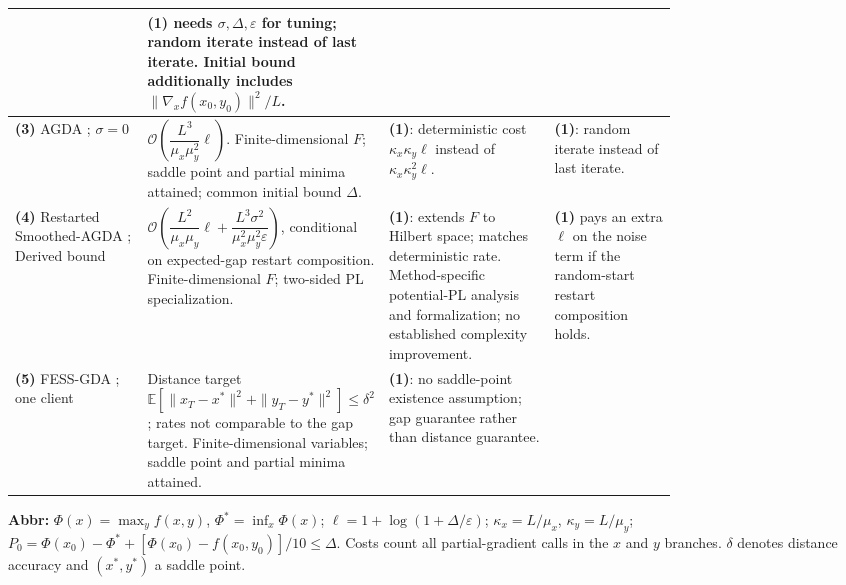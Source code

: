 \begin{table}[tp]
\begin{threeparttable}
\begin{tabularx}{\linewidth}{@{}>{\raggedright\arraybackslash}p{0.20\linewidth}>{\raggedright\arraybackslash}p{0.32\linewidth}>{\raggedright\arraybackslash}p{0.25\linewidth}>{\raggedright\arraybackslash}X@{}}
& \textbf{(1)} needs $\sigma,\Delta,\varepsilon$ for tuning; random iterate instead of last iterate. Initial bound additionally includes $\|\nabla_x f(x_0,y_0)\|^2/L$. \\
\midrule
\textbf{(3)} AGDA \citep[Theorem 3.2]{stplYang2020}; $\sigma=0$
& $\mathcal{O}\!\left(\dfrac{L^3}{\mu_x\mu_y^2}\ell\right)$.
Finite-dimensional $F$; saddle point and partial minima attained; common initial bound $\Delta$.
& \textbf{(1)}: deterministic cost $\kappa_x\kappa_y\ell$ instead of $\kappa_x\kappa_y^2\ell$.
& \textbf{(1)}: random iterate instead of last iterate. \\
\midrule
\textbf{(4)} Restarted Smoothed-AGDA \citep[Theorem 4.1]{stplYang2022}; Derived bound
& $\mathcal{O}\!\left(\dfrac{L^2}{\mu_x\mu_y}\ell+\dfrac{L^3\sigma^2}{\mu_x^2\mu_y^2\varepsilon}\right)$, conditional on expected-gap restart composition. Finite-dimensional $F$; two-sided PL specialization.
& \textbf{(1)}: extends $F$ to Hilbert space; matches deterministic rate. Method-specific potential-PL analysis and formalization; no established complexity improvement.
& \textbf{(1)} pays an extra $\ell$ on the noise term if the random-start restart composition holds. \\
\midrule
\textbf{(5)} FESS-GDA \citep[Theorem 3.5]{stplShen2024v2}; one client
& Distance target $\mathbb{E}[\|x_T-x^*\|^2+\|y_T-y^*\|^2]\le\delta^2$; rates not comparable to the gap target. Finite-dimensional variables; saddle point and partial minima attained.
& \textbf{(1)}: no saddle-point existence assumption; gap guarantee rather than distance guarantee. & \\
\bottomrule
\end{tabularx}
\begin{tablenotes}[flushleft]\footnotesize
\item[] \textbf{Abbr:} $\Phi(x)=\max_y f(x,y)$, $\Phi^*=\inf_x\Phi(x)$; $\ell=1+\log(1+\Delta/\varepsilon)$; $\kappa_x=L/\mu_x$, $\kappa_y=L/\mu_y$; $P_0=\Phi(x_0)-\Phi^*+[\Phi(x_0)-f(x_0,y_0)]/10\le\Delta$. Costs count all partial-gradient calls in the $x$ and $y$ branches. $\delta$ denotes distance accuracy and $(x^*,y^*)$ a saddle point.
\end{tablenotes}
\end{threeparttable}
\end{table}
\clearpage
